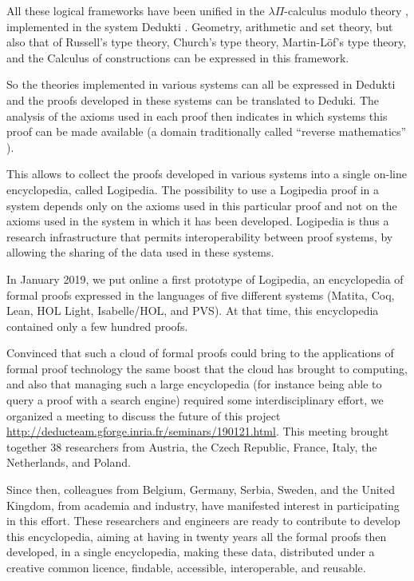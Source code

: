 All these logical frameworks have been unified in the $\lambda
\Pi$-calculus modulo theory \cite{CousineauDowek07}, implemented in
the system {\sc Dedukti} \cite{Assaf16}.  Geometry, arithmetic and set
theory, but also that of Russell's type theory, Church's type theory,
Martin-L\"of's type theory, and the Calculus of constructions can be
expressed in this framework.

So the theories implemented in various systems can all be expressed in
{\sc Dedukti} and the proofs developed in these systems can be
translated to {\sc Deduki}.  The analysis of the axioms used in each
proof then indicates in which systems this proof can be made available
\cite{Thire18,Dowek17} (a domain traditionally called ``reverse
mathematics'' \cite{Friedman76,Simpson09}).

This allows to collect the proofs developed in various systems into a
single on-line encyclopedia, called {\sc Logipedia}. The possibility
to use a {\sc Logipedia} proof in a system depends only on the axioms
used in this particular proof and not on the axioms used in the system
in which it has been developed. {\sc Logipedia} is thus a research
infrastructure that permits interoperability between proof systems, by
allowing the sharing of the data used in these systems.

In January 2019, we put online a first prototype of {\sc Logipedia},
an encyclopedia of formal proofs expressed in the languages of five
different systems ({\sc Matita}, {\sc Coq}, {\sc Lean}, {\sc HOL
  Light}, {\sc Isabelle/HOL}, and {\sc PVS}).  At that time, this
encyclopedia contained only a few hundred proofs.

Convinced that such a cloud of formal proofs could bring to the
applications of formal proof technology the same boost that the cloud
has brought to computing, and also that managing such a large
encyclopedia (for instance being able to query a proof with a search
engine) required some interdisciplinary effort, we organized a meeting
to discuss the future of this project
\url{http://deducteam.gforge.inria.fr/seminars/190121.html}.  This
meeting brought together 38 researchers from Austria, the Czech
Republic, France, Italy, the Netherlands, and Poland.

Since then, colleagues from Belgium, Germany, Serbia, Sweden, and the
United Kingdom, from academia and industry, have manifested interest
in participating in this effort.  These researchers and engineers are
ready to contribute to develop this encyclopedia, aiming at having in
twenty years all the formal proofs then developed, in a single
encyclopedia, making these data, distributed under a creative common
licence, findable, accessible, interoperable, and reusable.

